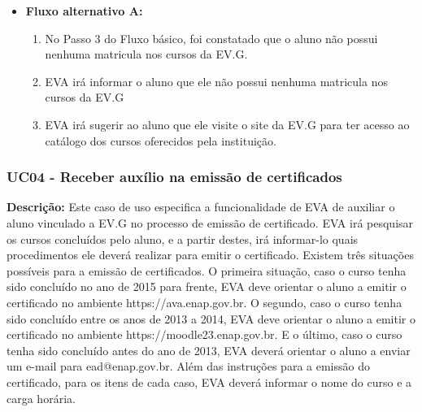\begin{itemize}
\begin{enumerate}
        \end{enumerate}
    \item \textbf{Fluxo alternativo A:}
        \begin{enumerate}
            \item No Passo 3 do Fluxo básico, foi constatado que o aluno não possui nenhuma matricula nos cursos da EV.G.
            \item EVA irá informar o aluno que ele não possui nenhuma matricula nos cursos da EV.G
            \item EVA irá sugerir ao aluno que ele visite o site da EV.G para ter acesso ao catálogo dos cursos oferecidos pela instituição.
        \end{enumerate}
\end{itemize}


\subsubsection{UC04 - Receber auxílio na emissão de certificados}
\textbf{Descrição:} Este caso de uso especifica a funcionalidade de EVA de auxiliar o aluno vinculado a EV.G no processo de emissão de certificado. EVA irá pesquisar os cursos concluídos pelo aluno, e a partir destes, irá informar-lo quais procedimentos ele deverá realizar para emitir o certificado. Existem três situações possíveis para a emissão de certificados. O primeira situação, caso o curso tenha sido concluído no ano de 2015 para frente, EVA deve orientar o aluno a emitir o certificado no ambiente https://ava.enap.gov.br. O segundo, caso o curso tenha sido concluído entre os anos de 2013 a 2014, EVA deve orientar o aluno a emitir o certificado no ambiente https://moodle23.enap.gov.br. E o último, caso o curso tenha sido concluído antes do ano de 2013, EVA deverá orientar o aluno a enviar um e-mail para ead@enap.gov.br. Além das instruções para a emissão do certificado, para os itens de cada caso, EVA deverá informar o nome do curso e a carga horária.

